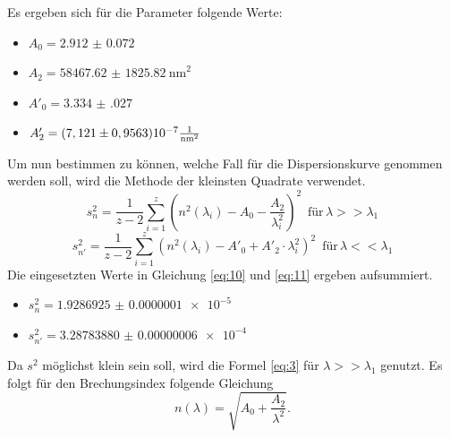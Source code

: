 Es ergeben sich für die Parameter folgende Werte:
\begin{itemize}
  \item $A_0 = \num{2.912(0072)}$
  \item $A_2 = \SI{58467.62(182582)}{\nano\meter}^2$
  \item $A'_0 = \num{3.334(027)}$
  \item $A'_2 = (7,121 \pm 0,9563)10^{-7} \si[per-mode=fraction]{\per\nano\meter\squared}$
\end{itemize}
Um nun bestimmen zu können, welche Fall für die Dispersionskurve genommen werden soll, wird
die Methode der kleinsten Quadrate verwendet.
\begin{equation}
  s^2_n = \frac{1}{z-2} \sum_{i=1}^{z}(n^2(\lambda_i)-A_0-\frac{A_2}{\lambda^2_i})^2 \,\,\, \text{für} \, \lambda >> \lambda_1
  \label{eq:10}
\end{equation}
\begin{equation}
  s^2_{n'} = \frac{1}{z-2} \sum_{i=1}^{z}(n^2(\lambda_i)-A'_0+A'_2 \cdot \lambda^2_i)^2 \,\,\, \text{für} \, \lambda << \lambda_1
  \label{eq:11}
\end{equation}
Die eingesetzten Werte in Gleichung \ref{eq:10} und \ref{eq:11} ergeben aufsummiert.
\begin{itemize}
  \item $s^2_n = \num{1.9286925(1)e-5}$
  \item $s^2_{n'} = \num{3.28783880(6)e-4}$
\end{itemize}
Da $s^2$ möglichst klein sein soll, wird die Formel \ref{eq:3} für $\lambda >> \lambda_1$ genutzt.
Es folgt für den Brechungsindex folgende Gleichung
\begin{equation}
  n(\lambda)= \sqrt{A_0 + \frac{A_2}{\lambda^2}}.
  \label{eq:12}
\end{equation}

